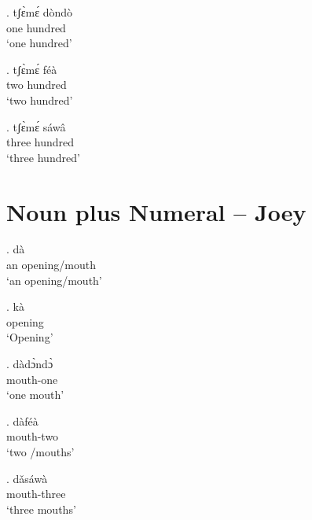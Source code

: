 \documentclass{assets/fieldnotes}
\begin{document}
\exg. tʃɛ̀mɛ́ dòndò\\
one hundred\\
`one hundred'


\exg. tʃɛ̀mɛ́ féà\\
two hundred\\
`two hundred'

\exg. tʃɛ̀mɛ́ sáwâ\\
three hundred\\
`three hundred'


\section{Noun plus Numeral -- Joey} 



\exg. dà\\
an opening/mouth\\
`an opening/mouth'

\exg. kà\\
opening\\
`Opening'

\exg. dàdɔ̀ndɔ̀\\
mouth-one\\
`one mouth' 

\exg. dàféà\\
mouth-two\\
`two /mouths' 

\exg. dǎsáwà\\
mouth-three\\
`three mouths' 
\end{document}
